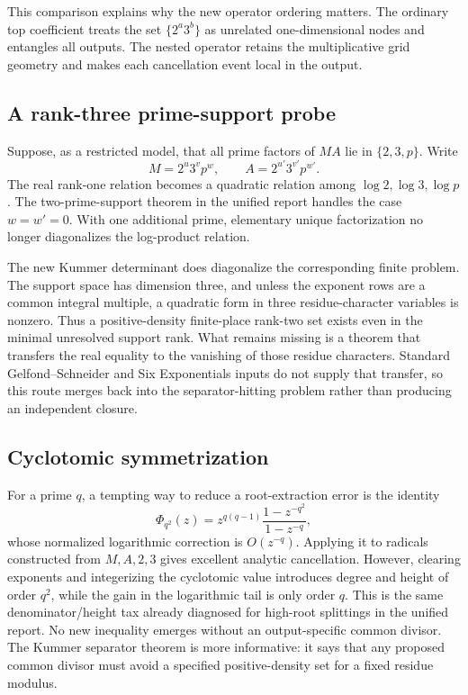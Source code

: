 \documentclass[11pt,oneside]{article}
\theoremstyle{definition}
\theoremstyle{remark}
\begin{document}
This comparison explains why the new operator ordering matters.  The ordinary top
coefficient treats the set $\{2^a3^b\}$ as unrelated one-dimensional nodes and entangles all
outputs.  The nested operator retains the multiplicative grid geometry and makes each
cancellation event local in the output.

\subsection{A rank-three prime-support probe}

Suppose, as a restricted model, that all prime factors of $MA$ lie in $\{2,3,p\}$.  Write
\[
 M=2^u3^vp^w,
 \qquad
 A=2^{u'}3^{v'}p^{w'}.
\]
The real rank-one relation becomes a quadratic relation among
$\log2,\log3,\log p$.  The two-prime-support theorem in the unified report handles the case
$w=w'=0$.  With one additional prime, elementary unique factorization no longer diagonalizes
the log-product relation.

The new Kummer determinant does diagonalize the corresponding finite problem.  The support
space has dimension three, and unless the exponent rows are a common integral multiple, a
quadratic form in three residue-character variables is nonzero.  Thus a positive-density
finite-place rank-two set exists even in the minimal unresolved support rank.  What remains
missing is a theorem that transfers the real equality to the vanishing of those residue
characters.  Standard Gelfond--Schneider and Six Exponentials inputs do not supply that
transfer, so this route merges back into the separator-hitting problem rather than producing
an independent closure.

\subsection{Cyclotomic symmetrization}

For a prime $q$, a tempting way to reduce a root-extraction error is the identity
\begin{equation}
 \Phi_{q^2}(z)=z^{q(q-1)}\frac{1-z^{-q^2}}{1-z^{-q}},
 \label{eq:cyclotomic-tail}
\end{equation}
whose normalized logarithmic correction is $O(z^{-q})$.  Applying it to radicals constructed
from $M,A,2,3$ gives excellent analytic cancellation.  However, clearing exponents and
integerizing the cyclotomic value introduces degree and height of order $q^2$, while the
gain in the logarithmic tail is only order $q$.  This is the same denominator/height tax
already diagnosed for high-root splittings in the unified report.  No new inequality emerges
without an output-specific common divisor.  The Kummer separator theorem is more informative:
it says that any proposed common divisor must avoid a specified positive-density set for a
fixed residue modulus.
\end{document}
